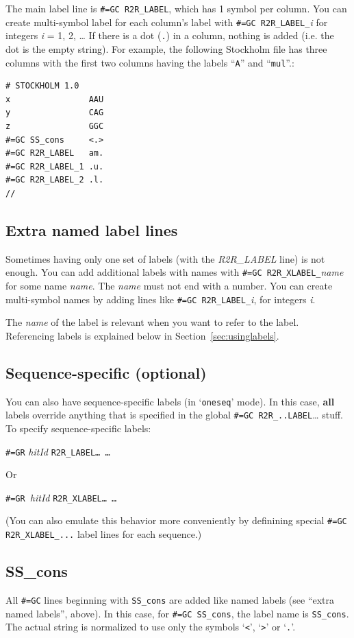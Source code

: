\documentclass[letterpaper,12pt]{report}
\begin{document}
The main label line is {\tt \#=GC R2R\_LABEL}, which has 1 symbol per
column.  You can create multi-symbol label for each column{\textquoteright}s label
with {\tt \#=GC R2R\_LABEL\_}\textit{i} for integers \textit{i} = 1, 2,
{\dots} If there is a dot ({\tt .}) in a
column, nothing is added (i.e. the dot is the empty string).
For example, the following Stockholm file has three columns with the first two
columns having the labels
``{\tt A}'' and
 ``{\tt mul}''.:

\begin{verbatim}
# STOCKHOLM 1.0
x                AAU
y                CAG
z                GGC
#=GC SS_cons     <.>
#=GC R2R_LABEL   am.
#=GC R2R_LABEL_1 .u.
#=GC R2R_LABEL_2 .l.
//
\end{verbatim}

\subsection{Extra named label lines }

Sometimes having only one set of labels (with the {\it R2R\_LABEL} line) is not enough.
You can add additional labels with names with {\tt \#=GC
R2R\_XLABEL\_}\textit{name} for some name \textit{name}.  The {\it name} must not end with a number. 
You can create multi-symbol names by adding lines like {\tt \#=GC R2R\_LABEL\_}\textit{i}, for integers {\it i}.

The {\it name} of the label is relevant when you want to refer to the label.
Referencing labels is explained below in Section~\ref{sec:usinglabels}.

\subsection{Sequence-specific (optional)}
You can also have sequence-specific labels (in
{\textquoteleft}{\tt oneseq}{\textquoteright} mode).  In this case,
\textbf{all} labels override anything that is specified in the global
{\tt \#=GC R2R\_..LABEL}{\dots} stuff.  To specify sequence-specific labels:

{\tt \#=GR} \textit{hitId} {\tt R2R\_LABEL{\dots}  {\dots}}

Or

{\tt \#=GR }\textit{hitId} {\tt R2R\_XLABEL{\dots}  {\dots}}

(You can also emulate this behavior more conveniently by definining
special {\tt \#=GC R2R\_XLABEL\_...} label lines for each sequence.)

\subsection[SS\_cons ]{SS\_cons}
All {\tt \#=GC} lines beginning with {\tt SS\_cons} are added like named labels (see
{\textquotedblleft}extra named labels{\textquotedblright}, above).  In
this case, for {\tt \#=GC SS\_cons}, the label name is {\tt SS\_cons}. The actual
string is normalized to use only the symbols
{\textquoteleft}{\tt {\textless}}{\textquoteright},
{\textquoteleft}{\tt {\textgreater}}{\textquoteright} or
{\textquoteleft}{\tt .}{\textquoteright}.
\end{document}
